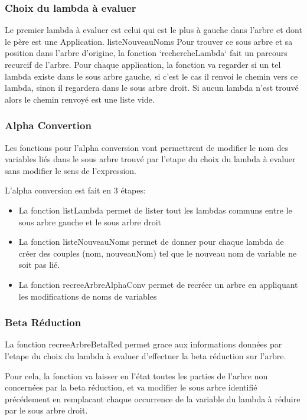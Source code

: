 \documentclass[a4paper,11pt,titlepage]{article}
\begin{document}
\subsubsection{Choix du lambda à evaluer}

Le premier lambda à evaluer est celui qui est le plus à gauche dans l'arbre et dont le père est une Application.
listeNouveauNoms
Pour trouver ce sous arbre et sa position dans l'arbre d'origine, la fonction `rechercheLambda` fait un parcours recurcif de l'arbre.
Pour chaque application, la fonction va regarder si un tel lambda existe dans le sous arbre gauche, si c'est le cas il renvoi le chemin vers ce lambda,
 sinon il regardera dans le sous arbre droit. Si aucun lambda n'est trouvé alors le chemin renvoyé est une liste vide.

\subsubsection{Alpha Convertion}

Les fonctions pour l'alpha conversion vont permettrent de modifier le nom des variables liés dans le sous arbre trouvé par 
l'etape du choix du lambda à evaluer sans modifier le sens de l'expression.

L'alpha conversion est fait en 3 étapes:
\begin{itemize}
 \item La fonction listLambda permet de lister tout les lambdas communs entre le sous arbre gauche et le sous arbre droit
 \item La fonction listeNouveauNoms permet de donner pour chaque lambda de créer des couples (nom, nouveauNom) tel que le nouveau
nom de variable ne soit pas lié.
 \item La fonction recreeArbreAlphaConv permet de recréer un arbre en appliquant les modifications de noms de variables
\end{itemize}


\subsubsection{Beta Réduction}

  La fonction recreeArbreBetaRed permet grace aux informations données par l'etape du choix du lambda à evaluer d'effectuer la
beta réduction sur l'arbre.

Pour cela, la fonction va laisser en l'état toutes les parties de l'arbre non concernées par la beta réduction, et va modifier
le sous arbre identifié précédement en remplacant chaque occurrence de la variable du lambda à réduire par le sous arbre
droit.
\end{document}
